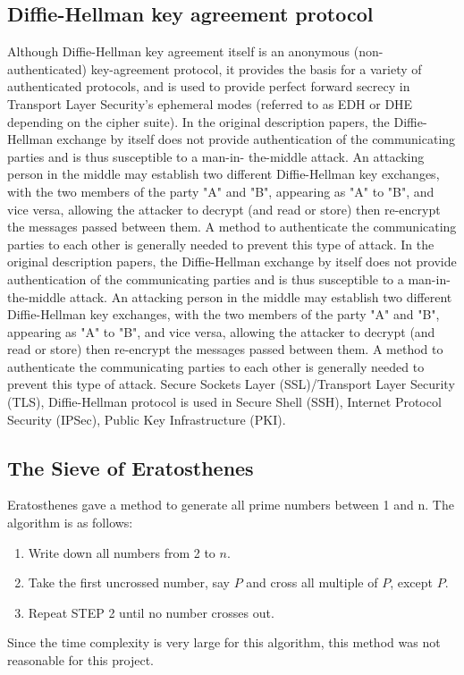 \documentclass[conference]{IEEEtran}
\begin{document}
\subsection{{\large Diffie-Hellman key agreement protocol}}
Although Diffie-Hellman\cite{diffie} key agreement itself is an anonymous (non-authenticated) key-agreement protocol, it provides the basis for a variety of authenticated protocols, and is used to provide perfect forward secrecy in Transport Layer Security's ephemeral modes (referred to as EDH or DHE depending on the cipher suite). In the original description papers, the Diffie-Hellman exchange by itself does not provide authentication of the communicating parties and is thus susceptible to a man-in- the-middle attack. An attacking person in the middle may establish two different Diffie-Hellman key exchanges, with the two members of the party "A" and "B", appearing as "A" to "B", and vice versa, allowing the attacker to decrypt \cite{diffie} (and read or store) then re-encrypt the messages passed between them. \cite{diffie} A method to authenticate the communicating parties to each other is generally needed to prevent this type of attack. In the original description papers, the Diffie-Hellman exchange by itself does not provide authentication of the communicating parties and is thus susceptible to a man-in- the-middle attack. An attacking person in the middle may establish two different Diffie-Hellman key exchanges, with the two members of the party "A" and "B", appearing as "A" to "B", and vice versa, allowing the attacker to decrypt \cite{diffie} (and read or store) then re-encrypt the messages passed between them. A method to authenticate the communicating parties to each other is generally needed to prevent this type of attack. Secure Sockets Layer (SSL)/Transport Layer Security (TLS), Diffie-Hellman protocol is used in Secure Shell (SSH), Internet Protocol Security (IPSec), Public Key Infrastructure (PKI).

\subsection{{\large The Sieve of Eratosthenes}}
Eratosthenes gave a method to generate all prime numbers between 1 and n.\cite{sieve_complexity} The algorithm is as follows:
\begin{enumerate}[ {STEP }1{:}]
\item Write down all numbers from 2 to $n$.
\item Take the first uncrossed number, say $P$ and cross all multiple of $P$, except $P$.
\item Repeat STEP 2 until no number crosses out.
\end{enumerate}
Since the time complexity is very large for this algorithm, this method was not reasonable for this project.
\end{document}
